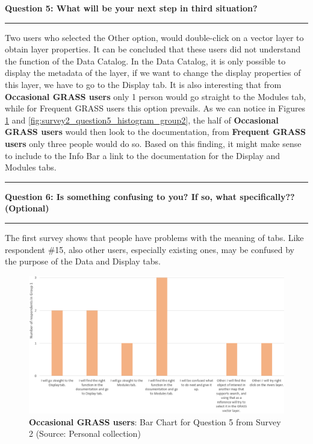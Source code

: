 \documentclass[a4paper,10pt,twoside]{article}
\begin{document}
\newpage
\noindent \textbf{Question 5:  What will be your next step in third situation?}
\par\noindent\rule{\textwidth}{0.4pt}

\noindent Two users who selected the Other option, would double-click on a vector layer to obtain layer properties. It can be concluded that these users did not understand the function of the Data Catalog. In the Data Catalog, it is only possible to display the metadata of the layer, if we want to change the display properties of this layer, we have to go to the Display tab. It is also interesting that from \textbf{Occasional GRASS users} only 1 person would go straight to the Modules tab, while for {Frequent GRASS users} this option prevails. As we can notice in Figures \ref{fig:survey2_question5_histogram_group1} and \ref{fig:survey2_question5_histogram_group2}, the half of \textbf{Occasional GRASS users} would then look to the documentation, from \textbf{Frequent GRASS users} only three people would do so. Based on this finding, it might make sense to include to the Info Bar a link to the documentation for the Display and Modules tabs.

\par\noindent\rule{\textwidth}{0.4pt}
\noindent \textbf{Question 6: Is something confusing to you? If so, what specifically?? (Optional)}
\par\noindent\rule{\textwidth}{0.4pt}

\noindent The first survey shows that people have problems with the meaning of tabs. Like respondent \#15, also other users, especially existing ones, may be confused by the purpose of the Data and Display tabs.

\vspace{0.3cm}
\begin{figure}[hbt!] 
\begin{center}
\includegraphics[width=17cm]{../surveys/analyzed_data/survey2_question5_histogram_group1.png} 
\caption[\textbf{Occasional GRASS users}: Bar Chart for Question 5 from Survey 2]{\textbf{Occasional GRASS users}: Bar Chart for Question 5 from Survey 2 (Source: Personal collection)}
\label{fig:survey2_question5_histogram_group1}
\end{center}
\end{figure}
\end{document}
